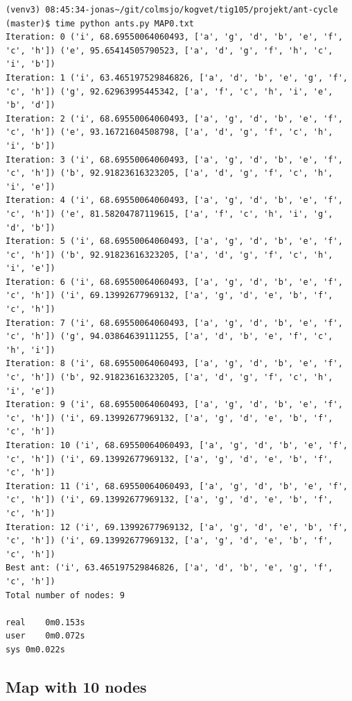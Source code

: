 \documentclass[11pt]{article}
\begin{document}
\begin{lstlisting}
(venv3) 08:45:34-jonas~/git/colmsjo/kogvet/tig105/projekt/ant-cycle (master)$ time python ants.py MAP0.txt
Iteration: 0 ('i', 68.69550064060493, ['a', 'g', 'd', 'b', 'e', 'f', 'c', 'h']) ('e', 95.65414505790523, ['a', 'd', 'g', 'f', 'h', 'c', 'i', 'b'])
Iteration: 1 ('i', 63.465197529846826, ['a', 'd', 'b', 'e', 'g', 'f', 'c', 'h']) ('g', 92.62963995445342, ['a', 'f', 'c', 'h', 'i', 'e', 'b', 'd'])
Iteration: 2 ('i', 68.69550064060493, ['a', 'g', 'd', 'b', 'e', 'f', 'c', 'h']) ('e', 93.16721604508798, ['a', 'd', 'g', 'f', 'c', 'h', 'i', 'b'])
Iteration: 3 ('i', 68.69550064060493, ['a', 'g', 'd', 'b', 'e', 'f', 'c', 'h']) ('b', 92.91823616323205, ['a', 'd', 'g', 'f', 'c', 'h', 'i', 'e'])
Iteration: 4 ('i', 68.69550064060493, ['a', 'g', 'd', 'b', 'e', 'f', 'c', 'h']) ('e', 81.58204787119615, ['a', 'f', 'c', 'h', 'i', 'g', 'd', 'b'])
Iteration: 5 ('i', 68.69550064060493, ['a', 'g', 'd', 'b', 'e', 'f', 'c', 'h']) ('b', 92.91823616323205, ['a', 'd', 'g', 'f', 'c', 'h', 'i', 'e'])
Iteration: 6 ('i', 68.69550064060493, ['a', 'g', 'd', 'b', 'e', 'f', 'c', 'h']) ('i', 69.13992677969132, ['a', 'g', 'd', 'e', 'b', 'f', 'c', 'h'])
Iteration: 7 ('i', 68.69550064060493, ['a', 'g', 'd', 'b', 'e', 'f', 'c', 'h']) ('g', 94.03864639111255, ['a', 'd', 'b', 'e', 'f', 'c', 'h', 'i'])
Iteration: 8 ('i', 68.69550064060493, ['a', 'g', 'd', 'b', 'e', 'f', 'c', 'h']) ('b', 92.91823616323205, ['a', 'd', 'g', 'f', 'c', 'h', 'i', 'e'])
Iteration: 9 ('i', 68.69550064060493, ['a', 'g', 'd', 'b', 'e', 'f', 'c', 'h']) ('i', 69.13992677969132, ['a', 'g', 'd', 'e', 'b', 'f', 'c', 'h'])
Iteration: 10 ('i', 68.69550064060493, ['a', 'g', 'd', 'b', 'e', 'f', 'c', 'h']) ('i', 69.13992677969132, ['a', 'g', 'd', 'e', 'b', 'f', 'c', 'h'])
Iteration: 11 ('i', 68.69550064060493, ['a', 'g', 'd', 'b', 'e', 'f', 'c', 'h']) ('i', 69.13992677969132, ['a', 'g', 'd', 'e', 'b', 'f', 'c', 'h'])
Iteration: 12 ('i', 69.13992677969132, ['a', 'g', 'd', 'e', 'b', 'f', 'c', 'h']) ('i', 69.13992677969132, ['a', 'g', 'd', 'e', 'b', 'f', 'c', 'h'])
Best ant: ('i', 63.465197529846826, ['a', 'd', 'b', 'e', 'g', 'f', 'c', 'h'])
Total number of nodes: 9

real	0m0.153s
user	0m0.072s
sys	0m0.022s
\end{lstlisting}


\subsection{Map with 10 nodes}
\end{document}

